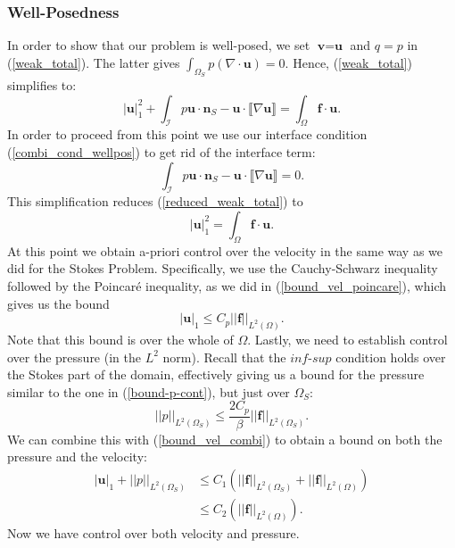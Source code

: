 \documentclass[12pt,a4paper]{article}
\theoremstyle{definition}
\begin{document}
\subsubsection{Well-Posedness}\label{combi_wellpos_generalframe}
 In order to show that our problem is well-posed, we set $\textbf{v}=\textbf{u}$  and $q=p$ in (\ref{weak_total}).  The latter gives $\int_{\Omega_S}p\left(\nabla \cdot \textbf{u}\right)=0$.  Hence, (\ref{weak_total}) simplifies to:
\begin{equation}\label{reduced_weak_total}
	\left|\textbf{u}\right|_1^2 + \int_{\mathcal{I}}p\textbf{u}\cdot \textbf{n}_S-\textbf{u}\cdot\llbracket \nabla \textbf{u}\rrbracket =\int_{\Omega}\textbf{f}\cdot \textbf{u}.
\end{equation}
In order to proceed from this point we use our interface condition (\ref{combi_cond_wellpos}) to get rid of the interface term:
\begin{equation}
\int_{\mathcal{I}}p\textbf{u}\cdot \textbf{n}_S-\textbf{u}\cdot \llbracket \nabla \textbf{u}\rrbracket=0.
\end{equation}
This simplification reduces (\ref{reduced_weak_total}) to 
\begin{equation}
\left|\textbf{u}\right|_1^2 =\int_{\Omega}\textbf{f}\cdot \textbf{u}.
\end{equation}
At this point we obtain a-priori control over the velocity in the same way as we did for the Stokes Problem.  Specifically, we use the Cauchy-Schwarz inequality followed by the Poincar{\'e} inequality, as we did in (\ref{bound_vel_poincare}), which gives us the bound
\begin{equation}\label{bound_vel_combi}
	\left|\textbf{u}\right|_1\leq C_p\left|\left|\textbf{f}\right|\right|_{L^2\left(\Omega\right)}.
\end{equation}
Note that this bound is over the whole of $\Omega$. Lastly, we need to establish control over the pressure (in the $L^2$ norm).  Recall that the $\textit{inf-sup}$ condition holds over the Stokes part of the domain, effectively giving us a bound for the pressure similar to the one in (\ref{bound-p-cont}), but just over $\Omega_S$:
\begin{equation}
\left|\left|p\right|\right|_{L^2\left(\Omega_S\right)} \leq \frac{2C_p}{\beta}\left|\left|\textbf{f}\right|\right|_{L^2\left(\Omega_S\right)}.
\end{equation}
We can combine this with (\ref{bound_vel_combi}) to obtain a bound on both the pressure and the velocity:
\begin{equation}
\begin{aligned}
\left|\textbf{u}\right|_1+\left|\left|p\right|\right|_{L^2\left(\Omega_S\right)}&\leq C_1\left(\left|\left|\textbf{f}\right|\right|_{L^2\left(\Omega_S\right)}+\left|\left|\textbf{f}\right|\right|_{L^2\left(\Omega\right)}\right)\\
&\leq C_2\left(\left|\left|\textbf{f}\right|\right|_{L^2\left(\Omega\right)}\right).
\end{aligned}
\end{equation}
Now we have control over both  velocity and  pressure.
\end{document}

